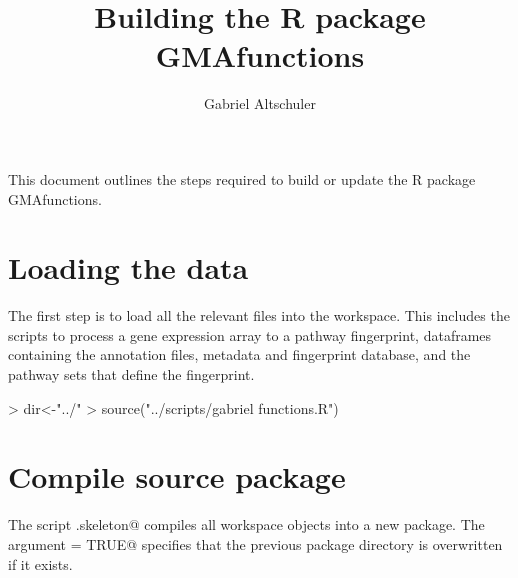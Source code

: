 \documentclass{article}
\renewenvironment{Schunk}{\vspace{\topsep}}{\vspace{\topsep}}
\begin{document}
\title{Building the R package GMAfunctions}
\author{Gabriel Altschuler}
\maketitle
This document outlines the steps required to build or update the R package GMAfunctions.
\section{Loading the data}
The first step is to load all the relevant files into the workspace. This includes the scripts to process a gene expression array to a pathway fingerprint, dataframes containing the annotation files, metadata and fingerprint database, and the pathway sets that define the fingerprint.
\begin{Schunk}
\begin{Sinput}
> dir<-"../"
> source("../scripts/gabriel functions.R")
\end{Sinput}
\end{Schunk}
\section{Compile source package}
The \verb@utils@ script \verb@package.skeleton@ compiles all workspace objects into a new package. The argument \verb@force = TRUE@ specifies that the previous package directory is overwritten if it exists.
\begin{Schunk}
\end{Schunk}
\end{document}
